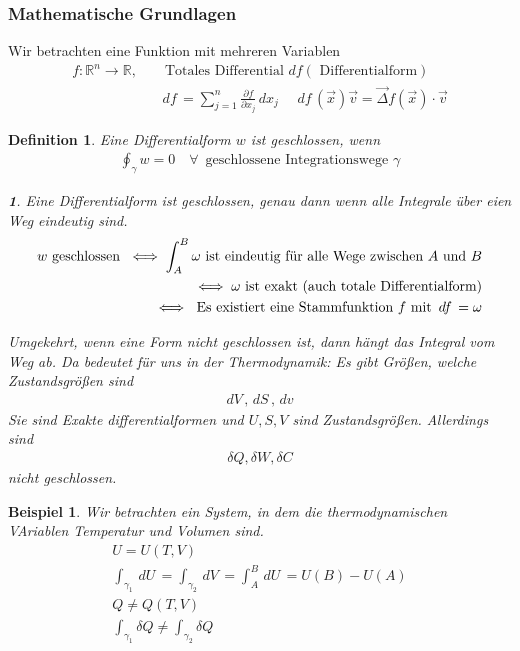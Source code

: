 \documentclass[11pt]{article}
\theoremstyle{plain}
\newtheorem*{beispiel}{Beispiel}
\newtheorem*{definition}{Definition}
\theoremstyle{mytheoremstyle}
\newtheorem*{theorem*}{}
\newcommand{\R}{\mathbb{R}}
\newcommand{\pd}[2]{\frac{\partial #1 }{\partial #2}}
\renewcommand{\d}[1]{\,d#1\,}
\begin{document}
\subsubsection*{Mathematische Grundlagen}
Wir betrachten eine Funktion mit mehreren Variablen
%
\begin{align*}
  f: \R^n \to \R, && \text{ Totales Differential } df (\text{ Differentialform}) \\
                  && \d{f} = \sum_{j=1}^{n} \pd{f}{x_j} \d{x_j} \quad 
  \d{f}(\vec{x})\vec{v}  = \vec{\Delta} f(\vec{x}) \cdot \vec{v}
\end{align*}
%
\begin{definition}
  Eine Differentialform $w$ ist geschlossen, wenn
  \begin{align*}
    \oint_{\gamma}^{} w = 0 \quad\forall\, \text{ geschlossene Integrationswege } \gamma
  \end{align*}
\begin{theorem*}
  Eine Differentialform ist geschlossen, genau dann wenn alle Integrale
  \"uber eien Weg eindeutig sind.
  \begin{align*}
    w \text{ geschlossen } \iff \int_{A}^{B} \omega \text{ ist eindeutig f\"ur
    alle Wege zwischen $A$ und $B$} \\
    \iff \omega \text{ ist exakt (auch totale Differentialform)} \\
    \iff \text{ Es existiert eine Stammfunktion $f$ mit $ \d{f} = \omega$}
  \end{align*}
\end{theorem*}
  Umgekehrt, wenn eine Form nicht geschlossen ist, dann h\"angt das Integral vom Weg ab.
  Da bedeutet f\"ur uns in der Thermodynamik:
  Es gibt Gr\"o\ss{}en, welche Zustandsgr\"o\ss{}en sind
  \begin{align*}
    \d{V}, \d{S}, \d{v}
  \end{align*}
  Sie sind Exakte differentialformen und $U, S, V$ sind Zustandsgr\"o\ss{}en.
  Allerdings sind
  \begin{align*}
    \delta Q, \delta W, \delta C
  \end{align*}
  nicht geschlossen.
\end{definition}
\begin{beispiel}
  Wir betrachten ein System, in dem die thermodynamischen VAriablen 
  Temperatur und Volumen sind.
  \begin{align*}
      U = U(T,V) \\
      \int_{\gamma_1}^{} \d{U} = \int_{\gamma_2}^{} \d{V} = 
      \int_{A}^{B} \d{U} = U(B)-U(A)\\
      Q \neq Q(T, V) \\
      \int_{\gamma_1}^{} \delta Q \neq \int_{\gamma_2}^{} \delta Q
  \end{align*}
\end{beispiel}
\end{document}
